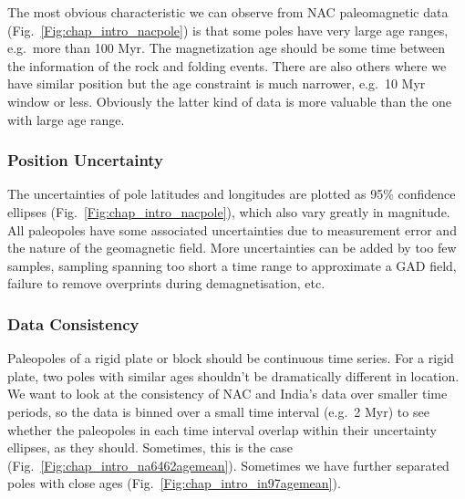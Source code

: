 The most obvious characteristic we can observe from NAC paleomagnetic data
(Fig.~\ref{Fig:chap_intro_nacpole}) is that some poles have very large age
ranges, e.g.\ more than 100 Myr. The magnetization age should be some time
between the information of the rock and folding events. There are also others
where we have similar position but the age constraint is much narrower, e.g.\ 10
Myr window or less. Obviously the latter kind of data is more valuable than the
one with large age range.

\subsubsection{Position Uncertainty}\label{sec:posu}

The uncertainties of pole latitudes and longitudes are plotted as 95\%
confidence ellipses (Fig.~\ref{Fig:chap_intro_nacpole}), which also vary greatly
in magnitude. All paleopoles have some associated uncertainties due to
measurement error and the nature of the geomagnetic field. More uncertainties
can be added by too few samples, sampling spanning too short a time range to
approximate a GAD field, failure to remove overprints during demagnetisation,
etc.

\subsubsection{Data Consistency}\label{sec:datcons}

Paleopoles of a rigid plate or block should be continuous time series. For a
rigid plate, two poles with similar ages shouldn't be dramatically different in
location. We want to look at the consistency of NAC and India's data over
smaller time periods, so the data is binned over a small time interval (e.g.\ 2
Myr) to see whether the paleopoles in each time interval overlap within their
uncertainty ellipses, as they should. Sometimes, this is the case
(Fig.~\ref{Fig:chap_intro_na6462agemean}). Sometimes we have further separated
poles with close ages (Fig.~\ref{Fig:chap_intro_in97agemean}).

